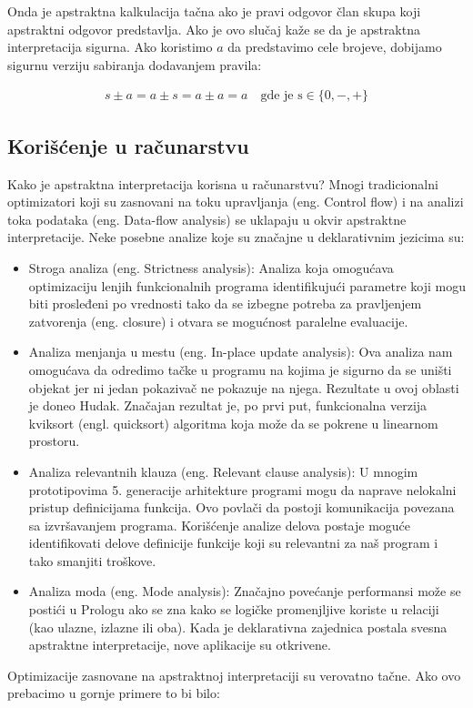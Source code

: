 Onda je apstraktna kalkulacija tačna ako je pravi odgovor član skupa koji apstraktni odgovor predstavlja. Ako je ovo slučaj kaže se da je apstraktna interpretacija sigurna. Ako koristimo $a$ da predstavimo cele brojeve, dobijamo sigurnu verziju sabiranja dodavanjem pravila:

\begin{multline}	
	s \pm a = a \pm s = a \pm a = a \quad \text{gde je s} \in \{0, -, +\}
\end{multline}


\subsection{Korišćenje u računarstvu}
\label{subsec:problem1}
Kako je apstraktna interpretacija korisna u računarstvu? Mnogi tradicionalni optimizatori koji su zasnovani na toku upravljanja (eng. Control flow) i na analizi toka podataka (eng. Data-flow analysis) se uklapaju u okvir apstraktne interpretacije. Neke posebne analize koje su značajne u deklarativnim jezicima su:

\begin{itemize}
\item Stroga analiza (eng. Strictness analysis):
Analiza koja omogućava optimizaciju lenjih  funkcionalnih programa identifikujući parametre koji mogu biti prosleđeni po vrednosti tako da se izbegne potreba za pravljenjem zatvorenja (eng. closure) i otvara se mogućnost paralelne evaluacije. 

\item Analiza menjanja u mestu (eng. In-place update analysis):
Ova analiza nam omogućava da odredimo tačke u programu na kojima je sigurno da se uništi objekat jer ni jedan pokazivač ne pokazuje na njega. Rezultate u ovoj oblasti je doneo Hudak. Značajan rezultat je, po prvi put, funkcionalna verzija kviksort (engl. quicksort) algoritma koja može da se pokrene u linearnom prostoru. \cite{Girard1987}

\item Analiza relevantnih klauza (eng. Relevant clause analysis):
U mnogim prototipovima 5. generacije arhitekture programi mogu da naprave nelokalni pristup definicijama funkcija. Ovo povlači da postoji komunikacija povezana sa izvršavanjem programa. Korišćenje analize delova postaje moguće identifikovati delove definicije funkcije koji su relevantni za naš program i tako smanjiti troškove.  

\item Analiza moda (eng. Mode analysis):
Značajno povećanje performansi može se postići u Prologu ako se zna kako se logičke promenjljive koriste u relaciji (kao ulazne, izlazne ili oba).
Kada je deklarativna zajednica postala svesna apstraktne interpretacije, nove aplikacije su otkrivene. 

\end{itemize}
Optimizacije zasnovane na apstraktnoj interpretaciji su verovatno tačne. Ako ovo prebacimo u gornje primere to bi bilo:

